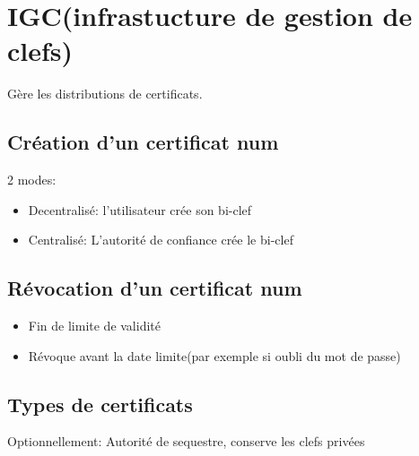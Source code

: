 \documentclass[12pt]{article}
\theoremstyle{plain}
\theoremstyle{definition}
\begin{document}
\section{IGC(infrastucture de gestion de clefs)}

Gère les distributions de certificats.

\subsection{Création d'un certificat num}
2 modes:
\begin{itemize}
    \item Decentralisé: l'utilisateur crée son bi-clef
    \item Centralisé: L'autorité de confiance crée le bi-clef
\end{itemize}

\subsection{Révocation d'un certificat num}
\begin{itemize}
    \item Fin de limite de validité
    \item Révoque avant la date limite(par exemple 
    si oubli du mot de passe)
\end{itemize}

\subsection{Types de certificats}
Optionnellement: Autorité de sequestre, conserve les clefs privées
\end{document}
